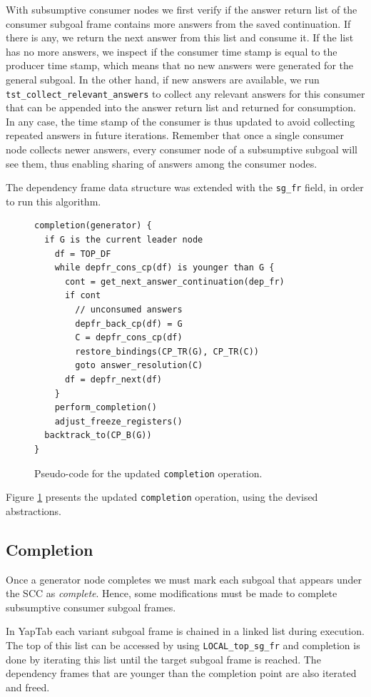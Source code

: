 With subsumptive consumer nodes we first verify if the answer return list of the
consumer subgoal frame contains more answers from the saved continuation. If there is
any, we return the next answer from this list and consume it. If the list has no more answers,
we inspect if the consumer time stamp is equal to the producer time stamp, which means
that no new answers were generated for the general subgoal. In the other hand, if new
answers are available, we run \texttt{tst\_collect\_relevant\_answers} to collect any
relevant answers for this consumer that can be appended into the answer return list
and returned for consumption.
In any case, the time stamp of the consumer is thus updated to avoid collecting
repeated answers in future iterations. Remember that once a single consumer node
collects newer answers, every consumer node of a subsumptive subgoal will see them, thus
enabling sharing of answers among the consumer nodes.

The dependency frame data structure was extended with the \texttt{sg\_fr} field,
in order to run this algorithm.

\begin{figure}[ht]
\begin{Verbatim}
completion(generator) {
  if G is the current leader node
    df = TOP_DF
    while depfr_cons_cp(df) is younger than G {
      cont = get_next_answer_continuation(dep_fr)
      if cont
        // unconsumed answers
        depfr_back_cp(df) = G
        C = depfr_cons_cp(df)
        restore_bindings(CP_TR(G), CP_TR(C))
        goto answer_resolution(C)
      df = depfr_next(df)
    }
    perform_completion()
    adjust_freeze_registers()
  backtrack_to(CP_B(G))
}
\end{Verbatim}
\caption{Pseudo-code for the updated \texttt{completion} operation.}
\label{fig:completion_operation}
\end{figure}

Figure \ref{fig:completion_operation} presents the updated \texttt{completion} operation,
using the devised abstractions.

\subsection{Completion}

Once a generator node completes we must mark each subgoal that appears under the SCC as \textit{complete}.
Hence, some modifications must be made to complete subsumptive consumer subgoal frames.

In YapTab each variant subgoal frame is chained in a linked list during execution. The top of this list
can be accessed by using \texttt{LOCAL\_top\_sg\_fr} and completion is done by iterating this list until
the target subgoal frame is reached. The dependency frames that are younger than the completion point
are also iterated and freed. 

